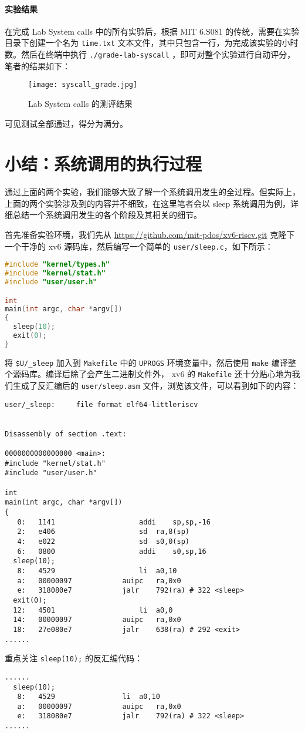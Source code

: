 \paragraph*{实验结果} 在完成 Lab System calls 中的所有实验后，根据 MIT 6.S081 的传统，需要在实验目录下创建一个名为 \lstinline{time.txt} 文本文件，其中只包含一行，为完成该实验的小时数。然后在终端中执行 \lstinline{./grade-lab-syscall} ，即可对整个实验进行自动评分，笔者的结果如下：
\begin{figure}[H]
  \centering
  \texttt{[image: syscall\_grade.jpg]}
  \caption{ Lab System calls 的测评结果}
\end{figure}
可见测试全部通过，得分为满分。

\section{小结：系统调用的执行过程}

通过上面的两个实验，我们能够大致了解一个系统调用发生的全过程。但实际上，上面的两个实验涉及到的内容并不细致，在这里笔者会以 sleep 系统调用为例，详细总结一个系统调用发生的各个阶段及其相关的细节。

首先准备实验环境，我们先从 \url{https://github.com/mit-pdos/xv6-riscv.git} 克隆下一个干净的 xv6 源码库，然后编写一个简单的 \lstinline{user/sleep.c}，如下所示：
\begin{lstlisting}[language=C]
#include "kernel/types.h"
#include "kernel/stat.h"
#include "user/user.h"

int
main(int argc, char *argv[])
{
  sleep(10);
  exit(0);
}
\end{lstlisting}

将 \lstinline{$U/_sleep} 加入到 \lstinline{Makefile} 中的 \lstinline{UPROGS} 环境变量中，然后使用 \lstinline{make} 编译整个源码库。编译后除了会产生二进制文件外， xv6 的 \lstinline{Makefile} 还十分贴心地为我们生成了反汇编后的 \lstinline{user/sleep.asm} 文件，浏览该文件，可以看到如下的内容：
\begin{lstlisting}
user/_sleep:     file format elf64-littleriscv


Disassembly of section .text:

0000000000000000 <main>:
#include "kernel/stat.h"
#include "user/user.h"

int
main(int argc, char *argv[])
{
   0:	1141                	addi	sp,sp,-16
   2:	e406                	sd	ra,8(sp)
   4:	e022                	sd	s0,0(sp)
   6:	0800                	addi	s0,sp,16
  sleep(10);
   8:	4529                	li	a0,10
   a:	00000097          	auipc	ra,0x0
   e:	318080e7          	jalr	792(ra) # 322 <sleep>
  exit(0);
  12:	4501                	li	a0,0
  14:	00000097          	auipc	ra,0x0
  18:	27e080e7          	jalr	638(ra) # 292 <exit>
......
\end{lstlisting}
重点关注 \lstinline{sleep(10);} 的反汇编代码：
\begin{lstlisting}
......
  sleep(10);
   8:	4529                li	a0,10
   a:	00000097          	auipc	ra,0x0
   e:	318080e7          	jalr	792(ra) # 322 <sleep>
......
\end{lstlisting}

